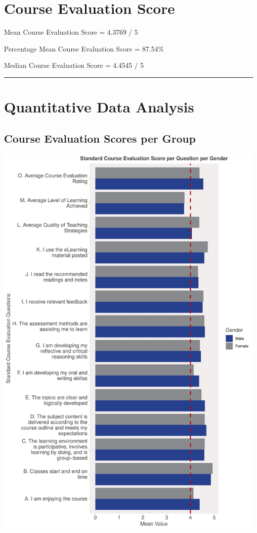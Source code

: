 \documentclass[
]{article}
\begin{document}
\section{Course Evaluation Score}\label{course-evaluation-score}

Mean Course Evaluation Score = 4.3769 / 5

Percentage Mean Course Evaluation Score = 87.54\%

Median Course Evaluation Score = 4.4545 / 5

\begin{center}\rule{0.5\linewidth}{0.5pt}\end{center}

\section{Quantitative Data Analysis}\label{quantitative-data-analysis}

\subsection{Course Evaluation Scores per
Group}\label{course-evaluation-scores-per-group}

\includegraphics{Mid-SemesterCourseEvaluation-20240819-20241125-ADB-BBIT2.2_files/figure-latex/VisualizationsForCourseEvaluationResultsperGender-1.pdf}
\end{document}
